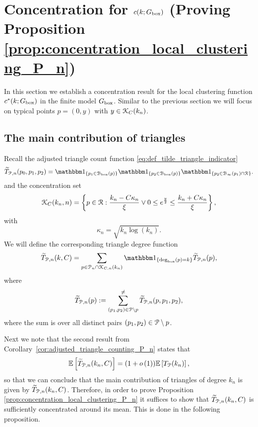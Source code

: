 \section{Concentration for $c(k; G_{\text{box}})$ (Proving Proposition \ref{prop:concentration_local_clustering_P_n})}
\label{sec:concentration_c_P_n}

In this section we establish a concentration result for the local clustering function $c^\ast(k; G_{\text{box}})$ in the finite model $G_{\text{box}}$. Similar to the previous section we will focus on typical points $p = (0,y)$ with $y \in {\mathcal K}_{C}(k_n)$.

\subsection{The main contribution of triangles}

Recall the adjusted triangle count function \eqref{eq:def_tilde_triangle_indicator}
\[
	\widetilde{T}_{\Pcal,n}(p_0,p_1,p_2) = \ind{p_1 \in \BallPon{p}}\ind{p_2 \in \BallPon{p}}\ind{p_2 \in \BallPo{p_1} \cap \Rcal}.
\]
and the concentration set
\[
	{\mathcal K}_C(k_n,n) = \left\{p \in {\mathcal R} : \frac{k_n - C \kappa_n}{\xi} \vee 0 \le e^{\frac{y}{2}}
		\le \frac{k_n + C \kappa_n}{\xi} \right\},
\]
with
\[
	\kappa_n = \sqrt{k_n \log(k_n)}.
\]
We will define the corresponding triangle degree function
\begin{equation}\label{eq:def_degree_triangle_count_in_K}
	\widetilde{T}_{\Pcal,n}(k, C) = \sum_{p \in \Pcal_n \cap \Kcal_{C,n}(k_n)} \ind{\text{deg}_{\text{box}}(p) = k} \widetilde{T}_{\Pcal,n}(p),
\end{equation}
where 
\[
	\widetilde{T}_{{\mathcal P},n}(p) := \sum_{(p_1, p_2) \in {\mathcal P} \setminus p}^{\ne} \widetilde{T}_{{\mathcal P},n}(p,p_1,p_2),
\]
where the sum is over all distinct pairs $(p_1, p_2) \in {\mathcal P} \setminus p$.

Next we note that the second result from Corollary~\ref{cor:adjusted_triangle_counting_P_n} states that
\begin{equation}\label{eq:asymptotic_equivalence_contraint_triangle_count}
	\mathbb{E}\left[\widetilde{T}_{{\mathcal P},n}(k_n,C)\right] = (1+o\left(1\right))\mathbb{E}\left[T_{{\mathcal P}}(k_n)\right],
\end{equation}
so that we can conclude that the main contribution of triangles of degree $k_n$ is given by $\widetilde{T}_{{\mathcal P},n}(k_n, C)$. Therefore, in order to prove Proposition \ref{prop:concentration_local_clustering_P_n} it suffices to show that $\widetilde{T}_{{\mathcal P},n}(k_n,C)$ is sufficiently concentrated around its mean. This is done in the following proposition.

